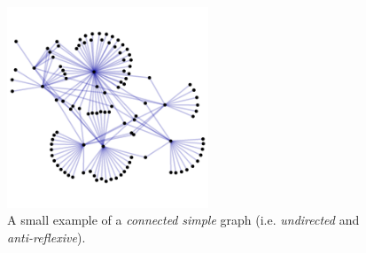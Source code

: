 \begin{figure}
\includegraphics[height=6cm]{simple_graph.png}
\caption{A small example of a \textsl{connected} \textsl{simple} graph (i.e. \textsl{undirected} and \textsl{anti-reflexive}).}
\label{fig:simple_graph}
\end{figure}
